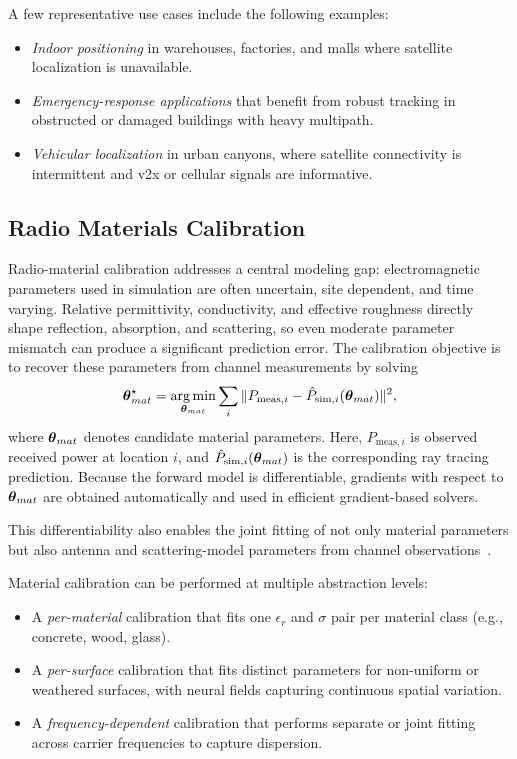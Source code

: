 A few representative use cases include the following examples:
\begin{itemize}
  \item \emph{Indoor positioning} in warehouses, factories, and malls where satellite localization is unavailable.
  \item \emph{Emergency-response applications} that benefit from robust tracking in obstructed or damaged buildings with heavy multipath.
  \item \emph{Vehicular localization} in urban canyons, where satellite connectivity is intermittent and \gls{v2x} or cellular signals are informative.
\end{itemize}

\subsection{Radio Materials Calibration}

Radio-material calibration addresses a central modeling gap: electromagnetic parameters used in simulation are often uncertain, site dependent, and time varying. Relative permittivity, conductivity, and effective roughness directly shape reflection, absorption, and scattering, so even moderate parameter mismatch can produce a significant prediction error. The calibration objective is to recover these parameters from channel measurements by solving
\begin{equation}
  \boldsymbol{\theta}_{mat}^\star = \operatorname*{arg\,min}_{\boldsymbol{\theta}_{mat}} \sum_i \|P_{\mathrm{meas},i} - \hat{P}_{\mathrm{sim},i}(\boldsymbol{\theta}_{mat})\|^2,
\end{equation}
where $\boldsymbol{\theta}_{mat}$ denotes candidate material parameters. Here, $P_{\mathrm{meas},i}$ is observed received power at location $i$, and $\hat{P}_{\mathrm{sim},i}(\boldsymbol{\theta}_{mat})$ is the corresponding ray tracing prediction. Because the forward model is differentiable, gradients with respect to $\boldsymbol{\theta}_{mat}$ are obtained automatically and used in efficient gradient-based solvers.

This differentiability also enables the joint fitting of not only material parameters but also antenna and scattering-model parameters from channel observations~.

Material calibration can be performed at multiple abstraction levels:
\begin{itemize}
  \item A \emph{per-material} calibration that fits one $\epsilon_r$ and $\sigma$ pair per material class (e.g., concrete, wood, glass).
  \item A \emph{per-surface} calibration that fits distinct parameters for non-uniform or weathered surfaces, with neural fields capturing continuous spatial variation.
  \item A \emph{frequency-dependent} calibration that performs separate or joint fitting across carrier frequencies to capture dispersion.
\end{itemize}

